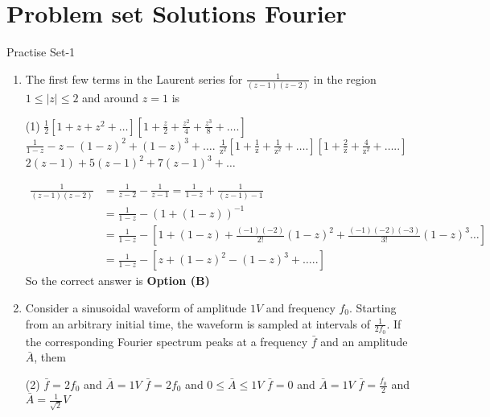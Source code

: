 \chapter{Problem set Solutions Fourier}
\begin{abox}
	Practise Set-1
\end{abox}
\begin{enumerate}[label=\color{ocre}\textbf{\arabic*.}]
	\item   The first few terms in the Laurent series for $\frac{1}{(z-1)(z-2)}$ in the region $1 \leq|z| \leq 2$ and around $z=1$ is
	{}
	\begin{tasks}(1)
		\task[\textbf{A.}] $\frac{1}{2}\left[1+z+z^{2}+\ldots\right]\left[1+\frac{z}{2}+\frac{z^{2}}{4}+\frac{z^{3}}{8}+\ldots .\right]$
		\task[\textbf{B.}] $\frac{1}{1-z}-z-(1-z)^{2}+(1-z)^{3}+\ldots .$
		\task[\textbf{C.}] $\frac{1}{\mathrm{z}^{2}}\left[1+\frac{1}{\mathrm{z}}+\frac{1}{\mathrm{z}^{2}}+\ldots .\right]\left[1+\frac{2}{\mathrm{z}}+\frac{4}{\mathrm{z}^{2}}+\ldots . .\right]$
		\task[\textbf{D.}]  $2(z-1)+5(z-1)^{2}+7(z-1)^{3}+\ldots$
	\end{tasks}
	\begin{answer}
		\begin{align*}
		\frac{1}{(z-1)(z-2)}&=\frac{1}{z-2}-\frac{1}{z-1}=\frac{1}{1-z}+\frac{1}{(z-1)-1}\\&=\frac{1}{1-z}-(1+(1-z))^{-1}\\
		&=\frac{1}{1-z}-\left[1+(1-z)+\frac{(-1)(-2)}{2 !}(1-z)^{2}+\frac{(-1)(-2)(-3)}{3 !}(1-z)^{3} \ldots\right]\\
		&=\frac{1}{1-z}-\left[z+(1-z)^{2}-(1-z)^{3}+\ldots . .\right]
		\end{align*}
		So the correct answer is \textbf{Option (B)}
	\end{answer}
	\item Consider a sinusoidal waveform of amplitude $1 V$ and frequency $f_{0}$. Starting from an arbitrary initial time, the waveform is sampled at intervals of $\frac{1}{2 f_{0}}$. If the corresponding Fourier spectrum peaks at a frequency $\bar{f}$ and an amplitude $\bar{A}$, them
	{}
	\begin{tasks}(2)
		\task[\textbf{A.}] $\bar{f}=2 f_{0}$ and $\bar{A}=1 V$
		\task[\textbf{B.}] $\bar{f}=2 f_{0}$ and $0 \leq \bar{A} \leq 1 V$
		\task[\textbf{C.}] $\bar{f}=0$ and $\bar{A}=1 V$
		\task[\textbf{D.}] $\bar{f}=\frac{f_{0}}{2}$ and $\bar{A}=\frac{1}{\sqrt{2}} V$
	\end{tasks}
	\begin{answer}$\left. \right. $

\end{answer}
\end{enumerate}
